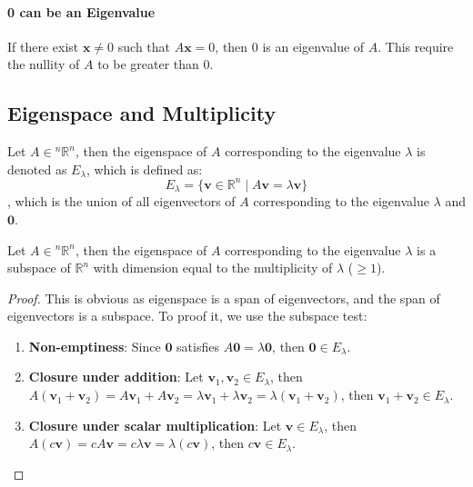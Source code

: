 \documentclass[11pt]{article}
\begin{document}
\paragraph{0 can be an Eigenvalue} If there exist $\textbf{x} \neq 0$ such that $A\textbf{x} = 0$, then 0 is an eigenvalue of $A$. This require the nullity of $A$ to be greater than 0.
\subsection{Eigenspace and Multiplicity}
\begin{definition}[Eigenspace]
    Let $A \in {^n\mathbb{R}^n}$, then the eigenspace of $A$ corresponding to the eigenvalue $\lambda$ is denoted as $E_\lambda$, which is defined as:
    \begin{equation}
        E_\lambda = \{ \textbf{v} \in \mathbb{R}^n \mid A\textbf{v} = \lambda \textbf{v} \}
    \end{equation}
    , which is the union of all eigenvectors of $A$ corresponding to the eigenvalue $\lambda$ and ${\textbf{0}}$.
\end{definition}
\begin{theorem}
    Let $A \in {^n\mathbb{R}^n}$, then the eigenspace of $A$ corresponding to the eigenvalue $\lambda$ is a subspace of $\mathbb{R}^n$ with dimension equal to the multiplicity of $\lambda$ ($\ge 1$).
\end{theorem}
\begin{proof}
    This is obvious as eigenspace is a span of eigenvectors, and the span of eigenvectors is a subspace. To proof it, we use the subspace test:
    \begin{enumerate}
        \item \textbf{Non-emptiness}: Since $\textbf{0}$ satisfies $A\textbf{0} = \lambda \textbf{0}$, then $\textbf{0} \in E_\lambda$.
        \item \textbf{Closure under addition}: Let $\textbf{v}_1, \textbf{v}_2 \in E_\lambda$, then $A(\textbf{v}_1 + \textbf{v}_2) = A\textbf{v}_1 + A\textbf{v}_2 = \lambda \textbf{v}_1 + \lambda \textbf{v}_2 = \lambda(\textbf{v}_1 + \textbf{v}_2)$, then $\textbf{v}_1 + \textbf{v}_2 \in E_\lambda$.
        \item \textbf{Closure under scalar multiplication}: Let $\textbf{v} \in E_\lambda$, then $A(c\textbf{v}) = cA\textbf{v} = c\lambda \textbf{v} = \lambda(c\textbf{v})$, then $c\textbf{v} \in E_\lambda$.
    \end{enumerate}
\end{proof}
\end{document}
